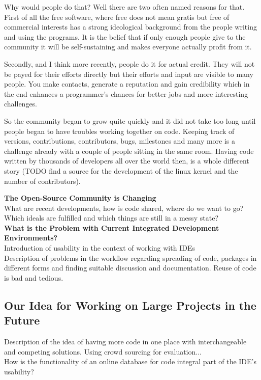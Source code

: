 \documentclass[11p]{scrartcl}
\begin{document}
Why would people do that?
Well there are two often named reasons for that. First of all the free software, where free does not mean gratis but free of commercial interests has a strong ideological background from the people writing and using the programs. It is the belief that if only enough people give to the community it will be self-sustaining and makes everyone actually profit from it. 

Secondly, and I think more recently, people do it for actual credit. They will not be payed for their efforts directly but their efforts and input are visible to many people. You make contacts, generate a reputation and gain credibility which in the end enhances a programmer's chances for better jobs and more interesting challenges.

So the community began to grow quite quickly and it did not take too long until people began to have troubles working together on code. Keeping track of versions, contributions, contributors, bugs, milestones and many more is a challenge already with a couple of people sitting in the same room. Having code written by thousands of developers all over the world then, is a whole different story (TODO find a  source for the development of the linux kernel and the number of contributors).




\textbf{The Open-Source Community is Changing}\\
What are recent developments, how is code shared, where do we want to go?
Which ideals are fulfilled and which  things are still in a messy state?\\

\textbf{What is the Problem with Current Integrated Development Environments?}\\
Introduction of usability in the context of working with IDEs\\
Description of problems in the workflow regarding spreading of code, packages in different forms and finding suitable discussion and documentation. Reuse of code is bad and tedious.


\subsection{Our Idea for Working on Large Projects in the Future}
Description of the idea of having more code in one place with interchangeable and competing solutions. Using crowd sourcing for evaluation...\\
How is the functionality of an online database for code integral part of the IDE's usability?\\
\end{document}
